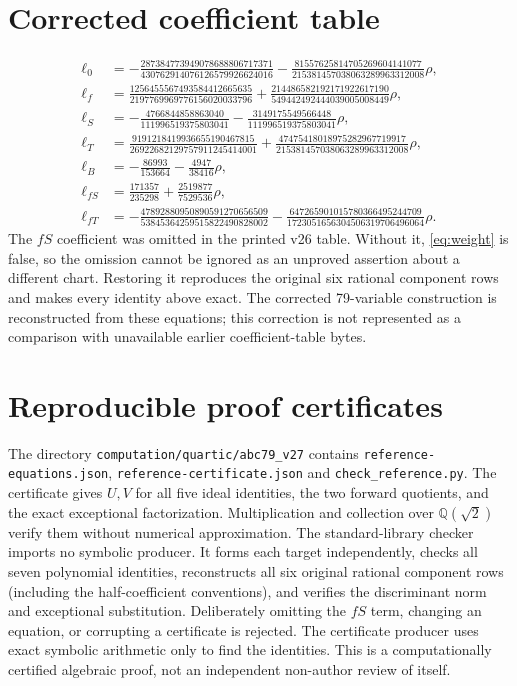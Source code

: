 \documentclass[11pt,a4paper]{article}
\newcommand{\Q}{\mathbb Q}\DeclareMathOperator{\Nm}{Nm}
\begin{document}
\section{Corrected coefficient table}\label{sec:coefficients}
\begin{align*}
\ell_0&=-\frac{287384773949078688806717371}{430762914076126579926624016}
         -\frac{81557625814705269604141077}{215381457038063289963312008}\rho,\\
\ell_f&=\frac{1256455567493584412665635}{2197769969776156020033796}
         +\frac{214486582192171922617190}{549442492444039005008449}\rho,\\
\ell_S&=-\frac{4766844858863040}{111996519375803041}
         -\frac{3149175549566448}{111996519375803041}\rho,\\
\ell_T&=\frac{9191218419936655190467815}{26922682129757911245414001}
         +\frac{47475418018975282967719917}{215381457038063289963312008}\rho,\\
\ell_B&=-\frac{86993}{153664}-\frac{4947}{38416}\rho,\\
\ell_{fS}&=\frac{171357}{235298}+\frac{2519877}{7529536}\rho,\\
\ell_{fT}&=-\frac{47892880950890591270656509}{53845364259515822490828002}
          -\frac{647265901015780366495244709}{1723051656304506319706496064}\rho.
\end{align*}
The $fS$ coefficient was omitted in the printed v26 table. Without it,
\eqref{eq:weight} is false, so the omission cannot be ignored as an
unproved assertion about a different chart. Restoring it reproduces the
original six rational component rows and makes every identity above
exact. The corrected 79-variable construction is reconstructed from
these equations; this correction is not represented as a comparison
with unavailable earlier coefficient-table bytes.

\section{Reproducible proof certificates}
The directory \nolinkurl{computation/quartic/abc79_v27} contains
\nolinkurl{reference-equations.json}, \nolinkurl{reference-certificate.json}
and \nolinkurl{check_reference.py}. The certificate gives $U,V$ for
all five ideal identities, the two forward quotients, and the exact
exceptional factorization. Multiplication and collection over
$\Q(\sqrt2)$ verify them without numerical approximation.
The standard-library checker imports no symbolic producer. It forms
each target independently, checks all seven polynomial identities,
reconstructs all six original rational component rows (including the
half-coefficient conventions), and verifies the discriminant norm and
exceptional substitution. Deliberately omitting the $fS$ term, changing
an equation, or corrupting a certificate is rejected. The certificate
producer uses exact symbolic arithmetic only to find the identities.
This is a computationally certified algebraic proof, not an independent
non-author review of itself.
\end{document}
